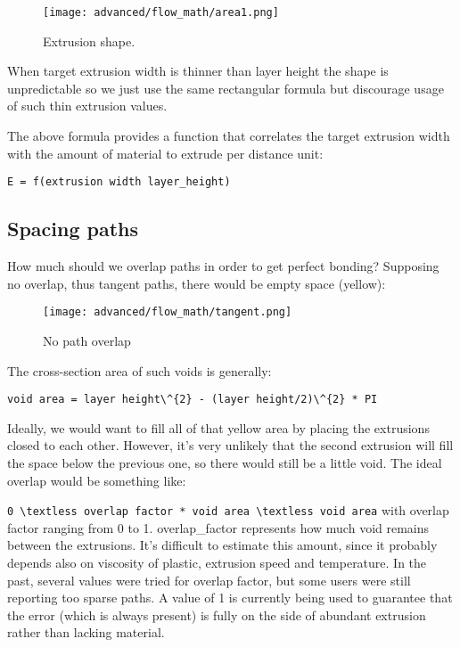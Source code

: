 \begin{figure}[H]
\centering
\texttt{[image: advanced/flow\_math/area1.png]}
\caption{Extrusion shape.}
\label{fig:area1}
\end{figure}

When target extrusion width is thinner than layer height the shape is unpredictable so we just use the same rectangular formula but discourage usage of such thin extrusion values.

The above formula provides a function that correlates the target extrusion width with the amount of material to extrude per distance unit:

\par \verb|E = f(extrusion width layer_height)|

\subsection{Spacing paths}
\label{sec:spacing_paths}

How much should we overlap paths in order to get perfect bonding?
Supposing no overlap, thus tangent paths, there would be empty space (yellow):

\begin{figure}[H]
\centering
\texttt{[image: advanced/flow\_math/tangent.png]}
\caption{No path overlap}
\label{fig:tangent}
\end{figure}

The cross-section area of such voids is generally:

\par \verb|void area = layer height\^{2} - (layer height/2)\^{2} * PI|

Ideally, we would want to fill all of that yellow area by placing the extrusions closed to each other. However, it's very unlikely that the second extrusion will fill the space below the previous one, so there would still be a little void. The ideal overlap would be something like:
\par \verb|0 \textless overlap factor * void area \textless void area|
with overlap factor ranging from 0 to 1. overlap_factor represents how much void remains between the extrusions. It's difficult to estimate this amount, since it probably depends also on viscosity of plastic, extrusion speed and temperature. In the past, several values were tried for overlap factor, but some users were still reporting too sparse paths. A value of 1 is currently being used to guarantee that the error (which is always present) is fully on the side of abundant extrusion rather than lacking material.

